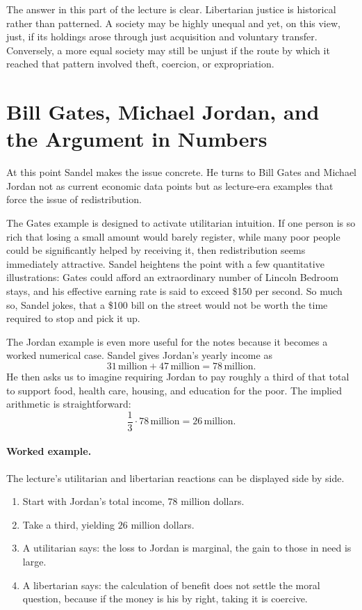 The answer in this part of the lecture is clear. Libertarian justice is historical rather than patterned. A society may be highly unequal and yet, on this view, just, if its holdings arose through just acquisition and voluntary transfer. Conversely, a more equal society may still be unjust if the route by which it reached that pattern involved theft, coercion, or expropriation.

\section{Bill Gates, Michael Jordan, and the Argument in Numbers}

At this point Sandel makes the issue concrete. He turns to Bill Gates and Michael Jordan not as current economic data points but as lecture-era examples that force the issue of redistribution.

The Gates example is designed to activate utilitarian intuition. If one person is so rich that losing a small amount would barely register, while many poor people could be significantly helped by receiving it, then redistribution seems immediately attractive. Sandel heightens the point with a few quantitative illustrations: Gates could afford an extraordinary number of Lincoln Bedroom stays, and his effective earning rate is said to exceed \$150 per second. So much so, Sandel jokes, that a \$100 bill on the street would not be worth the time required to stop and pick it up.

The Jordan example is even more useful for the notes because it becomes a worked numerical case. Sandel gives Jordan's yearly income as
\begin{equation}
31\,\text{million}+47\,\text{million}=78\,\text{million}.
\end{equation}
He then asks us to imagine requiring Jordan to pay roughly a third of that total to support food, health care, housing, and education for the poor. The implied arithmetic is straightforward:
\begin{equation}
\frac{1}{3}\cdot 78\,\text{million}=26\,\text{million}.
\end{equation}

\paragraph{Worked example.}
The lecture's utilitarian and libertarian reactions can be displayed side by side.
\begin{enumerate}
\item Start with Jordan's total income, \(78\) million dollars.
\item Take a third, yielding \(26\) million dollars.
\item A utilitarian says: the loss to Jordan is marginal, the gain to those in need is large.
\item A libertarian says: the calculation of benefit does not settle the moral question, because if the money is his by right, taking it is coercive.
\end{enumerate}

